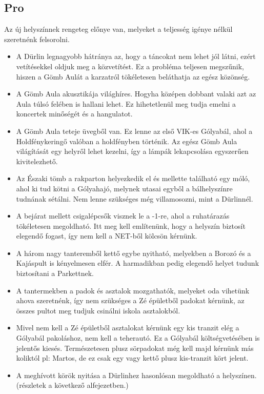 \subsection{Pro} 
\hspace{2mm} Az új helyszínnek rengeteg előnye van, melyeket a teljesség igénye nélkül szeretnénk felsorolni.
\begin{itemize}
	\item  A Dürlin legnagyobb hátránya az, hogy a táncokat nem lehet jól látni, ezért vetítésekkel oldjuk meg a közvetítést. Ez a probléma teljesen megszűnik, hiszen a Gömb Aulát a karzatról tökéletesen beláthatja az egész közönség.
	\item A Gömb Aula akusztikája világhíres. Hogyha középen dobbant valaki azt az Aula túlsó felében is hallani lehet. Ez hihetetlenül meg tudja emelni a koncertek minőségét és a hangulatot.
	\item A Gömb Aula teteje üvegből van. Ez lenne az első VIK-es Gólyabál, ahol a Holdfénykeringő valóban a holdfényben történik. Az egész Gömb Aula világítását egy helyről lehet kezelni, így a lámpák lekapcsolása egyszerűen kivitelezhető.
	\item Az Északi tömb a rakparton helyezkedik el és mellette található egy móló, ahol ki tud kötni a Gólyahajó, melynek utasai egyből a bálhelyszínre tudnának sétálni. Nem lenne szükséges még villamosozni, mint a Dürlinnél.
	\item A bejárat mellett csigalépcsők visznek le a -1-re, ahol a ruhatárazás tökéletesen megoldható. Itt meg kell említenünk, hogy a helyszín biztosít elegendő fogast, így nem kell a NET-ből kölcsön kérnünk.
	\item A három nagy tanteremből kettő egybe nyitható, melyekben a Borozó és a Kajáspult is kényelmesen elfér. A harmadikban pedig elegendő helyet tudunk biztosítani a Parkettnek.
	\item A tantermekben a padok és asztalok mozgathatók, melyeket oda vihetünk ahova szeretnénk, így nem szükséges a Zé épületből padokat kérnünk, az összes pultot meg tudjuk csinálni iskola asztalokból. 
	\item Mivel nem kell a Zé épületből asztalokat kérnünk egy kis tranzit elég a Gólyabál pakoláshoz, nem kell a teherautó. Ez a Gólyabál költségvetésében is jelentős kiesés. Természetesen plusz sörpadokat még kell majd kérnünk más koliktól pl: Martos, de ez csak egy vagy kettő plusz kis-tranzit kört jelent.
	\item A meghívott körök nyitása a Dürlinhez hasonlósan megoldható a helyszínen. (részletek a következő alfejezetben.)
\end{itemize}

